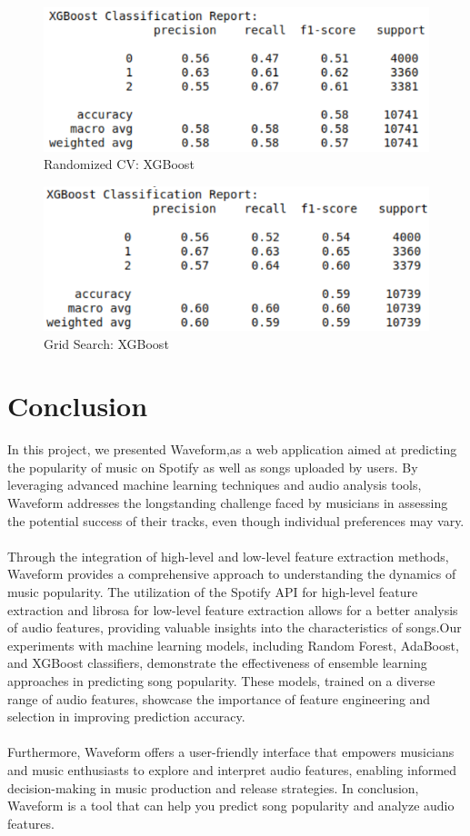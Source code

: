 \documentclass[11pt]{report}
\begin{document}
\begin{figure}[H]
    \centering
    \includegraphics[width=0.8\linewidth]{results/lowlevel_xgb_random.png}
    \caption{Randomized CV: XGBoost}
\end{figure}

\begin{figure}[H]
    \centering
    \includegraphics[width=0.8\linewidth]{results/lowlevel_xgb_grid.png}
    \caption{Grid Search: XGBoost}
\end{figure}

\clearpage

\chapter{Conclusion}

In this project, we presented Waveform,as a web application aimed at predicting the popularity of  music on Spotify as well as songs uploaded by users. By leveraging advanced machine learning techniques and audio analysis tools, Waveform addresses the longstanding challenge faced by musicians in assessing the potential success of their tracks, even though individual preferences may vary.
\\\\
Through the integration of high-level and low-level feature extraction methods, Waveform provides a comprehensive approach to understanding the dynamics of music popularity. The utilization of the Spotify API for high-level feature extraction and librosa for low-level feature extraction allows for a better analysis of audio features, providing valuable insights into the characteristics of songs.Our experiments with machine learning models, including Random Forest, AdaBoost, and XGBoost classifiers, demonstrate the effectiveness of ensemble learning approaches in predicting song popularity. These models, trained on a diverse range of audio features, showcase the importance of feature engineering and selection in improving prediction accuracy.
\\\\
Furthermore, Waveform offers a user-friendly interface that empowers musicians and music enthusiasts to explore and interpret audio features, enabling informed decision-making in music production and release strategies. In conclusion, Waveform is a tool that can help you  predict song popularity and analyze audio features. 
\end{document}
